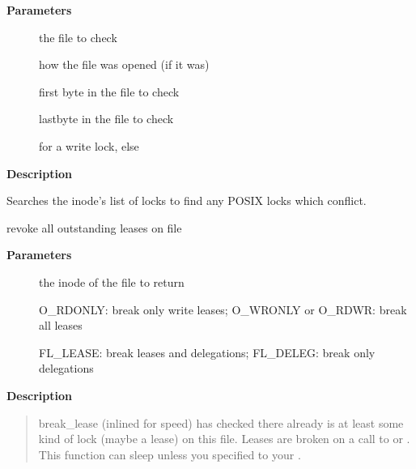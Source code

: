 \documentclass[a4paper,8pt,english]{sphinxmanual}
\begin{document}
\textbf{Parameters}
\begin{description}
\item[{}] \leavevmode
the file to check

\item[{}] \leavevmode
how the file was opened (if it was)

\item[{}] \leavevmode
first byte in the file to check

\item[{}] \leavevmode
lastbyte in the file to check

\item[{}] \leavevmode
{} for a write lock, else 

\end{description}

\textbf{Description}

Searches the inode's list of locks to find any POSIX locks which conflict.

\begin{fulllineitems}
\label{filesystems/index:c.__break_lease}
revoke all outstanding leases on file

\end{fulllineitems}


\textbf{Parameters}
\begin{description}
\item[{}] \leavevmode
the inode of the file to return

\item[{}] \leavevmode
O\_RDONLY: break only write leases; O\_WRONLY or O\_RDWR:
break all leases

\item[{}] \leavevmode
FL\_LEASE: break leases and delegations; FL\_DELEG: break
only delegations

\end{description}

\textbf{Description}
\begin{quote}

break\_lease (inlined for speed) has checked there already is at least
some kind of lock (maybe a lease) on this file.  Leases are broken on
a call to  or .  This function can sleep unless you
specified  to your .
\end{quote}
\end{document}
